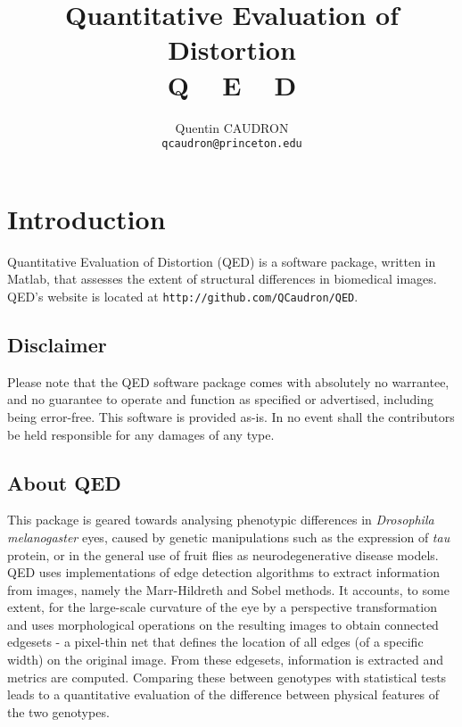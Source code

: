 \documentclass[a4paper,11pt]{article}
\title{\TitleFont \large{Quantitative Evaluation of Distortion}\vspace{0.5cm}\\ \Huge {\textbf{Q$\:\:\:\:\:\:$E$\:\:\:\:\:\:$D}} \vspace{0.5cm} }
\author{Quentin CAUDRON\\\texttt{qcaudron@princeton.edu}}
\begin{document}
\maketitle

\newpage

\setcounter{tocdepth}{3}
\tableofcontents

\newpage







\section{Introduction}

Quantitative Evaluation of Distortion (QED) is a software package, written in Matlab, that assesses the extent of structural differences in biomedical images. QED's website is located at \texttt{http://github.com/QCaudron/QED}.



\subsection{Disclaimer}

Please note that the QED software package comes with absolutely no warrantee, and no guarantee to operate and function as specified or advertised, including being error-free. This software is provided as-is. In no event shall the contributors be held responsible for any damages of any type.




\subsection{About QED}

This package is geared towards analysing phenotypic differences in \textit{Drosophila melanogaster} eyes, caused by genetic manipulations such as the expression of \textit{tau} protein, or in the general use of fruit flies as neurodegenerative disease models. QED uses implementations of edge detection algorithms to extract information from images, namely the Marr-Hildreth and Sobel methods. It accounts, to some extent, for the large-scale curvature of the eye by a perspective transformation and uses morphological operations on the resulting images to obtain connected edgesets - a pixel-thin net that defines the location of all edges (of a specific width) on the original image. From these edgesets, information is extracted and metrics are computed. Comparing these between genotypes with statistical tests leads to a quantitative evaluation of the difference between physical features of the two genotypes.
\end{document}
